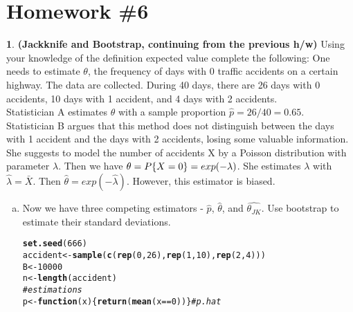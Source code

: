 \documentclass[12pt,fleqn]{article}\usepackage[]{graphicx}\usepackage[]{color}
\makeatletter
\newcommand{\hlnum}[1]{\textcolor[rgb]{0.686,0.059,0.569}{#1}}%
\newcommand{\hlcom}[1]{\textcolor[rgb]{0.678,0.584,0.686}{\textit{#1}}}%
\newcommand{\hlopt}[1]{\textcolor[rgb]{0,0,0}{#1}}%
\newcommand{\hlstd}[1]{\textcolor[rgb]{0.345,0.345,0.345}{#1}}%
\newcommand{\hlkwa}[1]{\textcolor[rgb]{0.161,0.373,0.58}{\textbf{#1}}}%
\newcommand{\hlkwb}[1]{\textcolor[rgb]{0.69,0.353,0.396}{#1}}%
\newcommand{\hlkwc}[1]{\textcolor[rgb]{0.333,0.667,0.333}{#1}}%
\newcommand{\hlkwd}[1]{\textcolor[rgb]{0.737,0.353,0.396}{\textbf{#1}}}%
\newenvironment{kframe}{%
 \def\at@end@of@kframe{}%
 \ifinner\ifhmode%
  \def\at@end@of@kframe{\end{minipage}}%
  \begin{minipage}{\columnwidth}%
 \fi\fi%
 \def\FrameCommand##1{\hskip\@totalleftmargin \hskip-\fboxsep
 \colorbox{shadecolor}{##1}\hskip-\fboxsep
     \hskip-\linewidth \hskip-\@totalleftmargin \hskip\columnwidth}%
 \MakeFramed {\advance\hsize-\width
   \@totalleftmargin\z@ \linewidth\hsize
   \@setminipage}}%
 {\par\unskip\endMakeFramed%
 \at@end@of@kframe}
\newenvironment{knitrout}{}{} %
\theoremstyle{definition}
\newtheorem{problem}{}
\makeatother
\begin{document}
\rhead{\today}




\section*{Homework \#6}
	\begin{problem} \textbf{(Jackknife and Bootstrap, continuing from the previous h/w)} Using your knowledge of the definition expected value complete the following:
		One needs to estimate $\theta$, the frequency of days with 0 traffic accidents on a certain highway. The data are collected. During 40 days, there are 26 days with 0 accidents, 10 days with 1 accident, and 4 days with 2 accidents.\\
  Statistician A estimates $\theta$ with a sample proportion $\hat{p} = 26/40 = 0.65$.\\
  Statistician B argues that this method does not distinguish between the days with 1 accident and the days with 2 accidents, losing some valuable information. She suggests to model the number of accidents X by a Poisson distribution with parameter $\lambda$. Then we have $\theta = \boldmath{P}\{X = 0\} = exp(-\lambda)$. She estimates $\lambda$ with $\hat{\lambda} = \bar{X}$. Then $\hat{\theta} = exp(-\hat{\lambda})$. However, this estimator is biased.
    \begin{enumerate}[(a)]
      \item Now we have three competing estimators - $\hat{p}$, $\hat{\theta}$, and $\hat{\theta_{JK}}$. Use bootstrap to estimate their standard deviations.
\begin{knitrout}
\color{fgcolor}\begin{kframe}
\begin{alltt}
\hlkwd{set.seed}\hlstd{(}\hlnum{666}\hlstd{)}
\hlstd{accident} \hlkwb{<-} \hlkwd{sample}\hlstd{(} \hlkwd{c}\hlstd{(}\hlkwd{rep}\hlstd{(}\hlnum{0}\hlstd{,}\hlnum{26}\hlstd{),}\hlkwd{rep}\hlstd{(}\hlnum{1}\hlstd{,}\hlnum{10}\hlstd{),}\hlkwd{rep}\hlstd{(}\hlnum{2}\hlstd{,}\hlnum{4}\hlstd{)) )}
\hlstd{B} \hlkwb{<-} \hlnum{10000}
\hlstd{n} \hlkwb{<-} \hlkwd{length}\hlstd{(accident)}
\hlcom{# estimations}
\hlstd{p} \hlkwb{<-} \hlkwa{function}\hlstd{(}\hlkwc{x}\hlstd{)\{}\hlkwd{return}\hlstd{(} \hlkwd{mean}\hlstd{(x} \hlopt{==} \hlnum{0}\hlstd{) )\}} \hlcom{# p.hat}

\end{alltt}
\end{kframe}
\end{knitrout}
\end{enumerate}
\end{problem}
\end{document}
